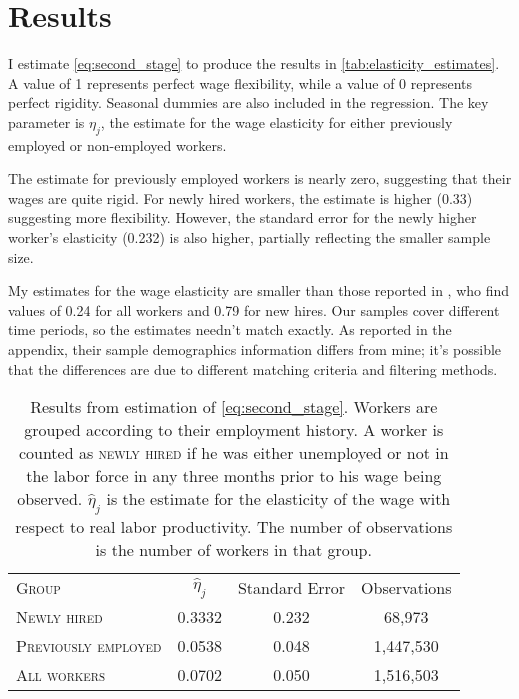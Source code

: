 \documentclass[11pt]{article}
\begin{document}
\section{Results}
\label{sec:results}

I estimate \autoref{eq:second_stage} to produce the results in \autoref{tab:elasticity_estimates}.
A value of 1 represents perfect wage flexibility, while a value of 0 represents perfect rigidity.
Seasonal dummies are also included in the regression.
The key parameter is $\eta_j$, the estimate for the wage elasticity for either previously employed or non-employed workers.

The estimate for previously employed workers is nearly zero, suggesting that their wages are quite rigid.
For newly hired workers, the estimate is higher (0.33) suggesting more flexibility.
However, the standard error for the newly higher worker's elasticity (0.232) is also higher, partially reflecting the smaller sample size.

My estimates for the wage elasticity are smaller than those reported in \cite{haefke_sonntag_vanRens_2013},  who find values of 0.24 for all workers and 0.79 for new hires.
Our samples cover different time periods, so the estimates needn't match exactly.
As reported in the appendix, their sample demographics information differs from mine;
it's possible that the differences are due to different matching criteria and filtering methods.

\begin{table}
    \centering
    \begin{tabular}{lccc} \toprule
        \textsc{Group}               & $\hat{\eta}_j$ & Standard Error & Observations\\
        \textsc{Newly hired}         & 0.3332       & 0.232            & 68,973       \\
        \textsc{Previously employed} & 0.0538       & 0.048            & 1,447,530     \\
        \textsc{All workers}         & 0.0702       & 0.050            & 1,516,503     \\ \bottomrule
    \end{tabular}
    \caption{
                Results from estimation of \autoref{eq:second_stage}.
                Workers are grouped according to their employment history.
                A worker is counted as \textsc{newly hired} if he was either unemployed
                or not in the labor force in any three months prior to his wage
                being observed. $\hat{\eta}_j$ is the estimate for the elasticity of the wage with respect to real labor productivity.
                The number of observations is the number of workers in that group.
            }
    \label{tab:elasticity_estimates}
\end{table}
\end{document}
